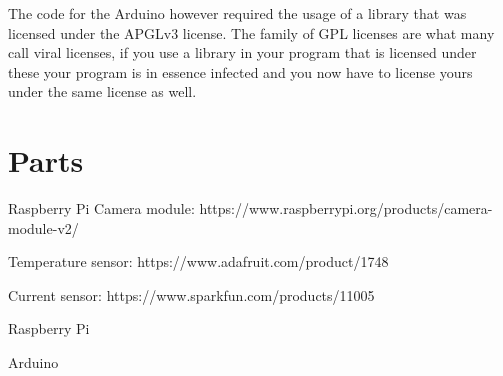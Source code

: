 \documentclass[12pt,a4paper,oneside,article]{memoir}
\numberwithin{equation}{chapter}
\begin{document}
The code for the Arduino however required the usage of a library that was
licensed under the APGLv3 license. The family of GPL licenses are what many call
viral licenses, if you use a library in your program that is licensed under
these your program is in essence infected and you now have to license yours
under the same license as well.

\chapter{Parts}\label{sec:parts}
Raspberry Pi Camera module: 
https://www.raspberrypi.org/products/camera-module-v2/

Temperature sensor: https://www.adafruit.com/product/1748

Current sensor: https://www.sparkfun.com/products/11005

Raspberry Pi

Arduino

\clearpage{}
\renewcommand*{\UrlFont}{\footnotesize\ttfamily}
\printbibliography{}
\end{document}
